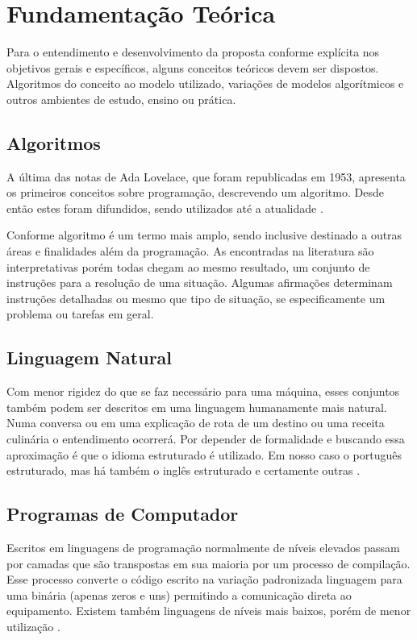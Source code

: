 
\chapter{Fundamentação Teórica}

Para o entendimento e desenvolvimento da proposta conforme explícita nos objetivos gerais e específicos, alguns conceitos teóricos devem ser dispostos. Algoritmos do conceito ao modelo utilizado, variações de modelos algorítmicos e outros ambientes de estudo, ensino ou prática.

\section{Algoritmos}

\ifdraft{\color{green}}{}A última das notas de Ada Lovelace, que foram republicadas em 1953\nocite{1253887}, apresenta os
primeiros conceitos sobre programação, descrevendo um algoritmo. Desde então
estes foram difundidos, sendo utilizados até a atualidade
\cite{santiago2003etal}.\color{black}

Conforme  algoritmo é um termo mais amplo, sendo inclusive destinado a outras áreas e finalidades além da programação. As encontradas na literatura são interpretativas porém todas chegam ao mesmo resultado, um conjunto de instruções para a resolução de uma situação. Algumas afirmações determinam instruções detalhadas ou mesmo que tipo de situação, se especificamente um problema ou tarefas em geral.

\section{Linguagem Natural}

Com menor rigidez do que se faz necessário para uma máquina, esses conjuntos também podem ser descritos em uma linguagem humanamente mais natural. Numa conversa ou em uma explicação de rota de um destino ou uma receita culinária o entendimento ocorrerá. Por depender de formalidade e buscando essa aproximação é que o idioma estruturado é utilizado. Em nosso caso o português estruturado, mas há também o inglês estruturado e certamente outras .

\section{Programas de Computador}

Escritos em linguagens de programação normalmente de níveis elevados passam por camadas que são transpostas em sua maioria por um processo de compilação. Esse processo converte o código escrito na variação padronizada linguagem para uma binária (apenas zeros e uns) permitindo a comunicação direta ao equipamento. Existem também linguagens de níveis mais baixos, porém de menor utilização .

